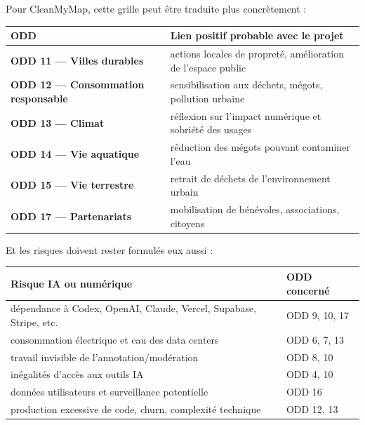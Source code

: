 \documentclass[
  10pt,
  a4paper,
  DIV=11,
  numbers=noendperiod,
  oneside]{scrreprt}
\newcounter{none} %
\let\oldtextbf\textbf
\renewcommand{\textbf}[1]{\oldtextbf{\textcolor{cmmnavy}{#1}}}
\begin{document}
Pour CleanMyMap, cette grille peut être traduite plus concrètement :

{\def\LTcaptype{none} %
\begin{longtable}[]{@{}
  >{\raggedright\arraybackslash}p{}
  >{\raggedright\arraybackslash}p{}@{}}
\toprule\noalign{}
\begin{minipage}[b]{\linewidth}\raggedright
ODD
\end{minipage} & \begin{minipage}[b]{\linewidth}\raggedright
Lien positif probable avec le projet
\end{minipage} \\
\midrule\noalign{}
\endhead
\bottomrule\noalign{}
\endlastfoot
\textbf{ODD 11 --- Villes durables} & actions locales de propreté,
amélioration de l'espace public \\
\textbf{ODD 12 --- Consommation responsable} & sensibilisation aux
déchets, mégots, pollution urbaine \\
\textbf{ODD 13 --- Climat} & réflexion sur l'impact numérique et
sobriété des usages \\
\textbf{ODD 14 --- Vie aquatique} & réduction des mégots pouvant
contaminer l'eau \\
\textbf{ODD 15 --- Vie terrestre} & retrait de déchets de
l'environnement urbain \\
\textbf{ODD 17 --- Partenariats} & mobilisation de bénévoles,
associations, citoyens \\
\end{longtable}
}

Et les risques doivent rester formulés eux aussi :

{\def\LTcaptype{none} %
\begin{longtable}[]{@{}
  >{\raggedright\arraybackslash}p{}
  >{\raggedright\arraybackslash}p{}@{}}
\toprule\noalign{}
\begin{minipage}[b]{\linewidth}\raggedright
Risque IA ou numérique
\end{minipage} & \begin{minipage}[b]{\linewidth}\raggedright
ODD concerné
\end{minipage} \\
\midrule\noalign{}
\endhead
\bottomrule\noalign{}
\endlastfoot
dépendance à Codex, OpenAI, Claude, Vercel, Supabase, Stripe, etc. & ODD
9, 10, 17 \\
consommation électrique et eau des data centers & ODD 6, 7, 13 \\
travail invisible de l'annotation/modération & ODD 8, 10 \\
inégalités d'accès aux outils IA & ODD 4, 10 \\
données utilisateurs et surveillance potentielle & ODD 16 \\
production excessive de code, churn, complexité technique & ODD 12,
13 \\
\end{longtable}
}
\end{document}
